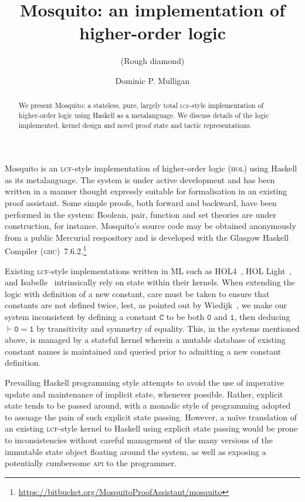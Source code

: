 \documentclass{llncs}
\author{Dominic P. Mulligan}
\title{Mosquito: an implementation of higher-order logic}
\subtitle{(Rough diamond)}
\institute{Computer Laboratory, University of Cambridge}
\newcommand{\mosquito}{Mosquito\xspace}
\begin{document}
\maketitle

\begin{abstract}
We present \mosquito: a stateless, pure, largely total \textsc{lcf}-style implementation of higher-order logic using Haskell as a metalanguage.
We discuss details of the logic implemented, kernel design and novel proof state and tactic representations.
\end{abstract}

\mosquito is an \textsc{lcf}-style implementation of higher-order logic (\textsc{hol}) using Haskell as its metalanguage.
The system is under active development and has been written in a manner thought expressly suitable for formalisation in an existing proof assistant.
Some simple proofs, both forward and backward, have been performed in the system: Boolean, pair, function and set theories are under construction, for instance.
\mosquito's source code may be obtained anonymously from a public Mercurial respository and is developed with the Glasgow Haskell Compiler (\textsc{ghc})~7.6.2.\footnote{\url{https://bitbucket.org/MosquitoProofAssistant/mosquito}}

Existing \textsc{lcf}-style implementations written in ML such as HOL4~\cite{gordon:introduction:1993}, HOL Light~\cite{harrison:hol:2009}, and Isabelle~\cite{wenzel:isabelle:2008} intrinsically rely on state within their kernels.
When extending the logic with definition of a new constant, care must be taken to ensure that constants are not defined twice, lest, as pointed out by Wiedijk~\cite{wiedijk:stateless:2011}, we make our system inconsistent by defining a constant $\mathtt{C}$ to be both $\mathtt{0}$ and $\mathtt{1}$, then deducing $\vdash \mathtt{0 = 1}$ by transitivity and symmetry of equality.
This, in the systems mentioned above, is managed by a stateful kernel wherein a mutable database of existing constant names is maintained and queried prior to admitting a new constant definition.

Prevailing Haskell programming style attempts to avoid the use of imperative update and maintenance of implicit state, whenever possible.
Rather, explicit state tends to be passed around, with a monadic style of programming adopted to assuage the pain of such explicit state passing.
However, a na\"ive translation of an existing \textsc{lcf}-style kernel to Haskell using explicit state passing would be prone to inconsistencies without careful management of the many versions of the immutable state object floating around the system, as well as exposing a potentially cumbersome \textsc{api} to the programmer.
\end{document}
